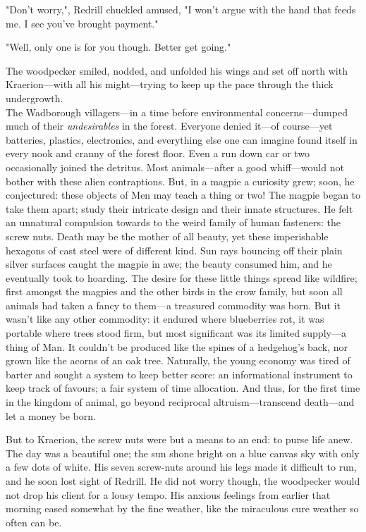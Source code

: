 "Don't worry,", Redrill chuckled amused, "I won't argue with the hand that feeds me. I see you've brought payment."

"Well, only one is for you though. Better get going."

The woodpecker smiled, nodded, and unfolded his wings and set off north with Kraerion---with all his might---trying to keep up the pace through the thick undergrowth.\\

The Wadborough villagers---in a time before environmental concerns---dumped much of their \textit{undesirables} in the forest. Everyone denied it---of course---yet batteries, plastics, electronics, and everything else one can imagine found itself in every nook and cranny of the forest floor. Even a run down car or two occasionally joined the detritus. Most animals---after a good whiff---would not bother with these alien contraptions. But, in a magpie a curiosity grew; soon, he conjectured: these objects of Men may teach a thing or two! The magpie began to take them apart; study their intricate design and their innate structures. He felt an unnatural compulsion towards to the weird family of human fasteners: the screw nuts. Death may be the mother of all beauty, yet these imperishable hexagons of cast steel were of different kind. Sun rays bouncing off their plain silver surfaces caught the magpie in awe; the beauty consumed him, and he eventually took to hoarding. The desire for these little things spread like wildfire; first amongst the magpies and the other birds in the crow family, but soon all animals had taken a fancy to them---a treasured commodity was born. But it wasn't like any other commodity: it endured where blueberries rot, it was portable where trees stood firm, but most significant was its limited supply---a thing of Man. It couldn't be produced like the spines of a hedgehog's back, nor grown like the acorns of an oak tree. Naturally, the young economy was tired of barter and sought a system to keep better score: an informational instrument to keep track of favours; a fair system of time allocation. And thus, for the first time in the kingdom of animal, go beyond reciprocal altruism---transcend death---and let a money be born.  

But to Kraerion, the screw nuts were but a means to an end: to purse life anew. \\

The day was a beautiful one; the sun shone bright on a blue canvas sky with only a few dots of white. His seven screw-nuts around his legs made it difficult to run, and he soon lost sight of Redrill. He did not worry though, the woodpecker would not drop his client for a lousy tempo. His anxious feelings from earlier that morning eased somewhat by the fine weather, like the miraculous cure weather so often can be. 

